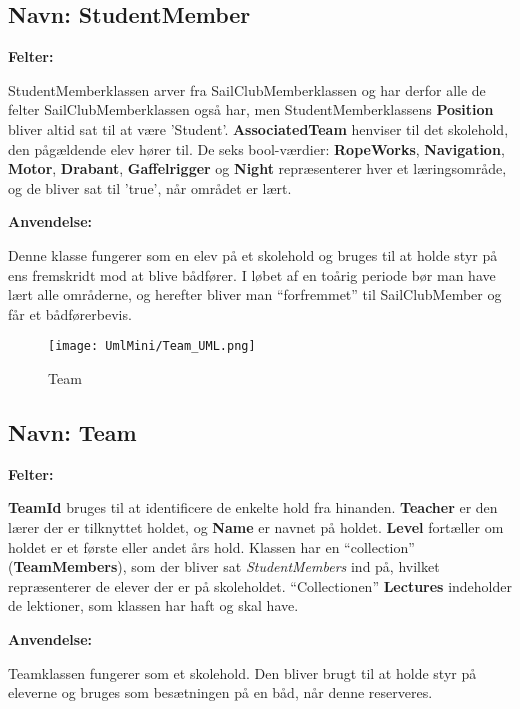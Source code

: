\subsection*{Navn: StudentMember}

\textbf{Felter:}

StudentMemberklassen arver fra SailClubMemberklassen og har derfor alle de felter SailClubMemberklassen også har, men StudentMemberklassens \textbf{Position} bliver altid sat til at være 'Student'. \textbf{AssociatedTeam} henviser til det skolehold, den pågældende elev hører til. De seks bool-værdier: \textbf{RopeWorks}, \textbf{Navigation}, \textbf{Motor}, \textbf{Drabant}, \textbf{Gaffelrigger} og \textbf{Night} repræsenterer hver et læringsområde, og de bliver sat til 'true', når området er lært. 

\textbf{Anvendelse:}

Denne klasse fungerer som en elev på et skolehold og bruges til at holde styr på ens fremskridt mod at blive bådfører. I løbet af en toårig periode bør man have lært alle områderne, og herefter bliver man ``forfremmet'' til SailClubMember og får et bådførerbevis.

\begin{wrapfigure}{R}{0.5\textwidth}
    \label{img:Team}
    \begin{center}
        \texttt{[image: UmlMini/Team\_UML.png]}
    \end{center}
    \caption{Team}
\end{wrapfigure}

\subsection*{Navn: Team}

\textbf{Felter:}

\textbf{TeamId} bruges til at identificere de enkelte hold fra hinanden. \textbf{Teacher} er den lærer der er tilknyttet holdet, og \textbf{Name} er navnet på holdet. \textbf{Level} fortæller om holdet er et første eller andet års hold. Klassen har en ``collection'' (\textbf{TeamMembers}), som der bliver sat \textit{StudentMembers} ind på, hvilket repræsenterer de elever der er på skoleholdet. ``Collectionen'' \textbf{Lectures} indeholder de lektioner, som klassen har haft og skal have. 

\textbf{Anvendelse:}

Teamklassen fungerer som et skolehold. Den bliver brugt til at holde styr på eleverne og bruges som besætningen på en båd, når denne reserveres. 


